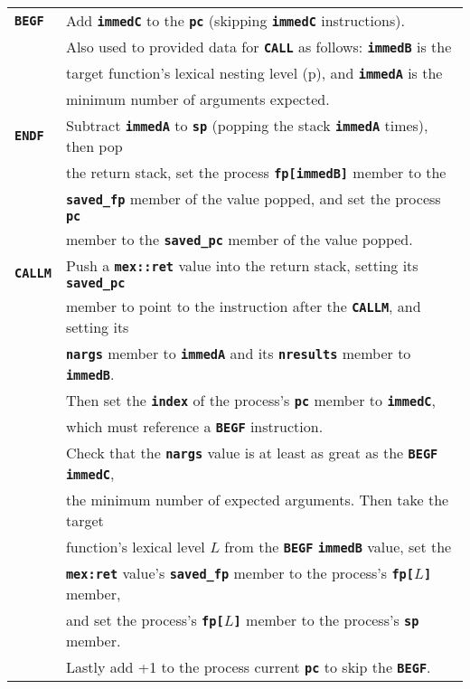 \documentclass[12pt]{article}
\newcommand{\TT}[1]{{\tt \bfseries #1}}
\newcommand{\pagref}[1]{p\pageref{#1}}
\newlength{\figurewidth}
\newenvironment{boxedfigure}[1][!btp]%
	{\begin{figure*}[#1]
	 \begin{lrbox}{\figurebox}
	 \begin{minipage}{\figurewidth}

	 \vspace*{1ex}}%
	{
	 \vspace*{1ex}

	 \end{minipage}
	 \end{lrbox}

	 \centering
	 \fbox{\hspace*{0.1in}\usebox{\figurebox}\hspace*{0.1in}}
	 \end{figure*}}
\begin{document}
\begin{boxedfigure}

\begin{center}
\begin{tabular}{|l|l|}
\hline
\TT{BEGF}
    & Add \TT{immedC} to the \TT{pc} (skipping \TT{immedC} instructions).
    \\[0.5ex]
    & Also used to provided data for \TT{CALL} as follows: \TT{immedB} is the \\
    & target function's lexical nesting level (\pagref{LEXICAL-NESTING-LEVEL}),
      and \TT{immedA} is the \\
    & minimum number of arguments expected.
\\\hline
\TT{ENDF}
    & Subtract \TT{immedA} to \TT{sp} (popping the stack \TT{immedA} times),
    					then pop \\
    & the return stack, set the process \TT{fp[immedB]} member to the \\
    & \TT{saved\_fp} member of the value popped, and set the process \TT{pc} \\
    & member to the \TT{saved\_pc} member of the value popped.
\\\hline
\TT{CALLM}
    & Push a \TT{mex::ret} value into the return stack, setting its
      \TT{saved\_pc} \\
    & member to point to the instruction after the \TT{CALLM},
      and setting its \\
    & \TT{nargs} member to \TT{immedA} and its \TT{nresults} member
      to \TT{immedB}.  \\
    & Then set the \TT{index} of the process's \TT{pc} member to \TT{immedC}, \\
    & which must reference a \TT{BEGF} instruction.
    \\[0.5ex]
    & Check that the \TT{nargs} value is at least as great as the \TT{BEGF}
      \TT{immedC}, \\
    & the minimum number of expected arguments.  Then take the target \\
    & function's lexical level $L$ from the \TT{BEGF} \TT{immedB} value,
      set the \\
    & \TT{mex:ret} value's \TT{saved\_fp} member to the process's
      \TT{fp[$L$]} member, \\
    & and set the process's \TT{fp[$L$]} member to the process's
      \TT{sp} member.
    \\[0.5ex]
    & Lastly add +1 to the process current \TT{pc} to skip the \TT{BEGF}.
\\\hline

\end{tabular}
\end{center}
\end{boxedfigure}
\end{document}
